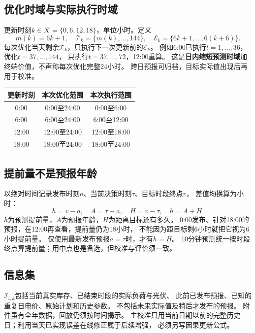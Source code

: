 \documentclass[UTF8,11pt]{ctexart}
\begin{document}
\subsection{优化时域与实际执行时域}
更新时刻$k\in\mathcal K=\{0,6,12,18\}$，单位小时。定义
\begin{equation}
 m(k)=6k+1,\quad \mathcal T_k=\{m(k),\ldots,144\},\quad
 \mathcal E_k=\{6k+1,\ldots,6(k+6)\}.
\end{equation}
每次优化当天剩余$\mathcal T_k$，只执行下一次更新前的$\mathcal E_k$。
例如6:00已执行$t=1,\ldots,36$，优化$t=37,\ldots,144$，
只执行$t=37,\ldots,72$，12:00重算。
这是\textbf{日内缩短预测时域}加终端价值，不声称每次优化完整24小时。
跨日预报可归档，目标实际值出现后再用于校准。
\begin{center}
\begin{tabular}{ccc}
\toprule 更新时刻 & 本次优化范围 & 本次执行范围\\ \midrule
0:00 & 0:00至24:00 & 0:00至6:00\\
6:00 & 6:00至24:00 & 6:00至12:00\\
12:00 & 12:00至24:00 & 12:00至18:00\\
18:00 & 18:00至24:00 & 18:00至24:00\\
\bottomrule
\end{tabular}
\end{center}

\subsection{提前量不是预报年龄}
以绝对时间记录发布时刻$a$、当前决策时刻$\tau$、目标时段终点$v$，
差值均换算为小时：
\begin{equation}\label{eq:lead}
 h=v-a,\quad A=\tau-a,\quad H=v-\tau,\quad h=A+H .
\end{equation}
$h$为预测提前量，$A$为预报年龄，$H$为距离目标还有多久。
0:00发布、针对18:00的预报，在12:00再查看，提前量仍为18小时，
不能因为距目标剩6小时就把它视为6小时提前量。
仅使用最新发布预报$a=\tau$时，才有$h=H$。
10分钟预测统一按时段终点算提前量；用中点也是备选，但校准与评价须一致。

\subsection{信息集}
$\mathcal I_{i,k}$包括当前真实库存、已结束时段的实际负荷与光伏、
此前已发布预报、已知的重复日电价、原始计划和历史参数。
不包括未来实际值及稍后才发布的预报。
附件虽有全年数据，回放仍须按时间揭示。
主校准只用当前日期以前的完整历史日；利用当天已实现误差在线修正属于后续增强，
必须另写因果更新公式。
\end{document}
